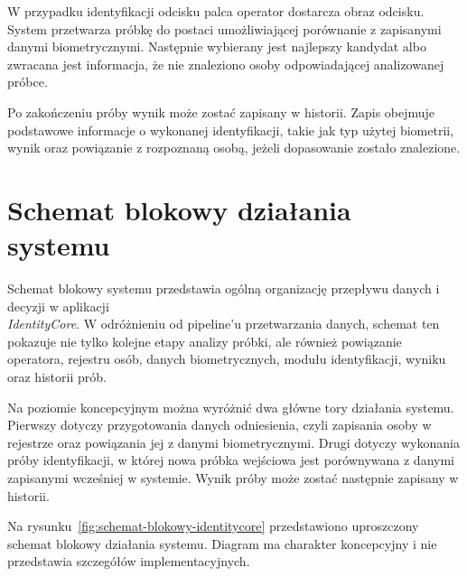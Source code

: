 W przypadku identyfikacji odcisku palca operator dostarcza obraz odcisku. System przetwarza próbkę do postaci umożliwiającej porównanie z zapisanymi danymi biometrycznymi. Następnie wybierany jest najlepszy kandydat albo zwracana jest informacja, że nie znaleziono osoby odpowiadającej analizowanej próbce.

Po zakończeniu próby wynik może zostać zapisany w historii. Zapis obejmuje podstawowe informacje o wykonanej identyfikacji, takie jak typ użytej biometrii, wynik oraz powiązanie z rozpoznaną osobą, jeżeli dopasowanie zostało znalezione.

\newpage

\section{Schemat blokowy działania systemu}

Schemat blokowy systemu przedstawia ogólną organizację przepływu danych i decyzji w aplikacji \\\textit{IdentityCore}. W odróżnieniu od pipeline'u przetwarzania danych, schemat ten pokazuje nie tylko kolejne etapy analizy próbki, ale również powiązanie operatora, rejestru osób, danych biometrycznych, modułu identyfikacji, wyniku oraz historii prób.

Na poziomie koncepcyjnym można wyróżnić dwa główne tory działania systemu. Pierwszy dotyczy przygotowania danych odniesienia, czyli zapisania osoby w rejestrze oraz powiązania jej z danymi biometrycznymi. Drugi dotyczy wykonania próby identyfikacji, w której nowa próbka wejściowa jest porównywana z danymi zapisanymi wcześniej w systemie. Wynik próby może zostać następnie zapisany w historii.

\bigskip
\bigskip

Na rysunku~\ref{fig:schemat-blokowy-identitycore} przedstawiono uproszczony schemat blokowy działania systemu. Diagram ma charakter koncepcyjny i nie przedstawia szczegółów implementacyjnych.

